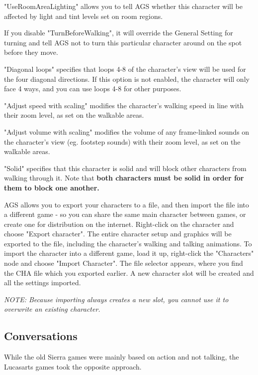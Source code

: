 "UseRoomAreaLighting" allows you to tell AGS whether this character will be
affected by light and tint levels set on room regions.

If you disable "TurnBeforeWalking", it will override the General Setting for
turning and tell AGS not to turn this particular character around on the
spot before they move.

"Diagonal loops" specifies that loops 4-8 of the character's view will be used for
the four diagonal directions. If this option is not enabled, the character will only
face 4 ways, and you can use loops 4-8 for other purposes.

"Adjust speed with scaling" modifies the character's walking speed in line with their
zoom level, as set on the walkable areas.

"Adjust volume with scaling" modifies the volume of any frame-linked sounds on the
character's view (eg. footstep sounds) with their zoom level, as set on the walkable areas.

"Solid" specifies that this character is solid and will block other characters from
walking through it. Note that \bf{both} characters must be solid in order for them
to block one another.

AGS allows you to export your characters to a file, and then import the file into a
different game - so you can share the same main character between games, or
create one for distribution on the internet. Right-click on the character and
choose "Export character". The entire character setup and graphics will be exported
to the file, including the character's walking and talking animations.
To import the character into a different game, load it up, right-click the "Characters"
node and choose "Import Character". The file selector appears, where you find the CHA file which
you exported earlier. A new character slot will be created and all the settings imported.

\it{NOTE: Because importing always creates a new slot, you cannot use it to
overwrite an existing character.}

\subsection{Conversations}%

While the old Sierra games were mainly based on action and not talking, the
Lucasarts games took the opposite approach.

